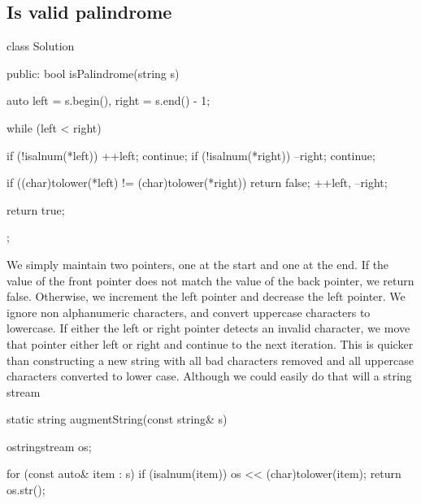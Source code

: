 \documentclass{report}
\begin{document}
\pagebreak 
\subsection{Is valid palindrome}
\bigbreak \noindent 
\begin{cppcode}
    class Solution {
        public:
        bool isPalindrome(string s) {
            auto left = s.begin(), right = s.end() - 1;

            while (left < right) {
                if (!isalnum(*left)) { ++left; continue; }
                if (!isalnum(*right)) { --right; continue; }

                if ((char)tolower(*left) != (char)tolower(*right)) return false;
                ++left, --right;
            }
            return true;
        }
    };
\end{cppcode}
\bigbreak \noindent 
We simply maintain two pointers, one at the start and one at the end. If the value of the front pointer does not match the value of the back pointer, we return false. Otherwise, we increment the left pointer and decrease the left pointer.
\bigbreak \noindent 
We ignore non alphanumeric characters, and convert uppercase characters to lowercase. If either the left or right pointer detects an invalid character, we move that pointer either left or right and continue to the next iteration. This is quicker than constructing a new string with all bad characters removed and all uppercase characters converted to lower case. Although we could easily do that will a string stream
\bigbreak \noindent 
\begin{cppcode}
    static string augmentString(const string& s) {
        ostringstream os;

        for (const auto& item : s) {
            if (isalnum(item)) os << (char)tolower(item);
        }
        return os.str();
    }
\end{cppcode}









\pagebreak 
{}
\bigbreak \noindent 
\end{document}
